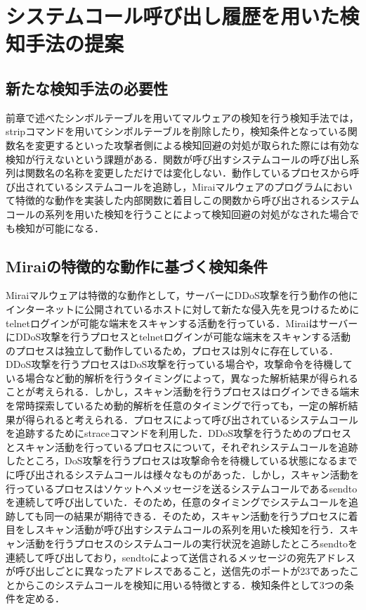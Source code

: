 \chapter{システムコール呼び出し履歴を用いた検知手法の提案}

\section{新たな検知手法の必要性}
前章で述べたシンボルテーブルを用いてマルウェアの検知を行う検知手法では，stripコマンドを用いてシンボルテーブルを削除したり，検知条件となっている関数名を変更するといった攻撃者側による検知回避の対処が取られた際には有効な検知が行えないという課題がある．関数が呼び出すシステムコールの呼び出し系列は関数名の名称を変更しただけでは変化しない．動作しているプロセスから呼び出されているシステムコールを追跡し，Miraiマルウェアのプログラムにおいて特徴的な動作を実装した内部関数に着目しこの関数から呼び出されるシステムコールの系列を用いた検知を行うことによって検知回避の対処がなされた場合でも検知が可能になる．


\section{Miraiの特徴的な動作に基づく検知条件}
Miraiマルウェアは特徴的な動作として，サーバーにDDoS攻撃を行う動作の他にインターネットに公開されているホストに対して新たな侵入先を見つけるためにtelnetログインが可能な端末をスキャンする活動を行っている．MiraiはサーバーにDDoS攻撃を行うプロセスとtelnetログインが可能な端末をスキャンする活動のプロセスは独立して動作しているため，プロセスは別々に存在している．DDoS攻撃を行うプロセスはDoS攻撃を行っている場合や，攻撃命令を待機している場合など動的解析を行うタイミングによって，異なった解析結果が得られることが考えられる．しかし，スキャン活動を行うプロセスはログインできる端末を常時探索しているため動的解析を任意のタイミングで行っても，一定の解析結果が得られると考えられる．プロセスによって呼び出されているシステムコールを追跡するためにstraceコマンドを利用した．DDoS攻撃を行うためのプロセスとスキャン活動を行っているプロセスについて，それぞれシステムコールを追跡したところ，DoS攻撃を行うプロセスは攻撃命令を待機している状態になるまでに呼び出されるシステムコールは様々なものがあった．しかし，スキャン活動を行っているプロセスはソケットへメッセージを送るシステムコールであるsendtoを連続して呼び出していた．そのため，任意のタイミングでシステムコールを追跡しても同一の結果が期待できる．そのため，スキャン活動を行うプロセスに着目をしスキャン活動が呼び出すシステムコールの系列を用いた検知を行う．スキャン活動を行うプロセスのシステムコールの実行状況を追跡したところsendtoを連続して呼び出しており，sendtoによって送信されるメッセージの宛先アドレスが呼び出しごとに異なったアドレスであること，送信先のポートが23であったことからこのシステムコールを検知に用いる特徴とする．検知条件として3つの条件を定める．

